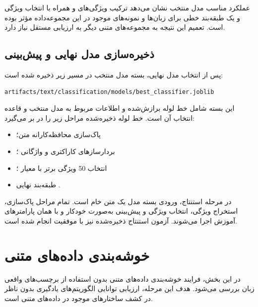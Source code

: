\documentclass[12pt,a4paper,oneside]{report}
\begin{document}
عملکرد مناسب مدل منتخب نشان می‌دهد ترکیب ویژگی‌های
و
همراه با انتخاب ویژگی
و یک طبقه‌بند خطی برای زبان‌ها و نمونه‌های موجود در این مجموعه‌داده مؤثر بوده است. تعمیم این نتیجه به مجموعه‌های متنی دیگر به ارزیابی مستقل نیاز دارد.


\subsection{ذخیره‌سازی مدل نهایی و پیش‌بینی}

پس از انتخاب مدل نهایی، بسته مدل منتخب در مسیر زیر ذخیره شده است:

\begin{latin}
\begin{verbatim}
artifacts/text/classification/models/best_classifier.joblib
\end{verbatim}
\end{latin}

این بسته شامل خط لوله برازش‌شده و اطلاعات مربوط به مدل منتخب و قاعده انتخاب آن است. خط لوله ذخیره‌شده مراحل زیر را در بر می‌گیرد:

\begin{itemize}
	\item پاک‌سازی محافظه‌کارانه متن؛
	\item بردارسازهای کاراکتری و واژگانی ؛
	\item انتخاب 50 ویژگی برتر با معیار ؛
	\item طبقه‌بند نهایی .
\end{itemize}

در مرحله استنتاج، ورودی بسته مدل یک متن خام
است. تمام مراحل پاک‌سازی، استخراج ویژگی، انتخاب ویژگی و پیش‌بینی به‌صورت خودکار و با همان پارامترهای آموزش اجرا می‌شوند. آزمون استنتاج ذخیره‌شده نیز با موفقیت انجام شده است.

\section{خوشه‌بندی داده‌های متنی}

در این بخش، فرایند خوشه‌بندی داده‌های متنی بدون استفاده از برچسب‌های واقعی زبان بررسی می‌شود. هدف این مرحله، ارزیابی توانایی الگوریتم‌های یادگیری بدون ناظر در کشف ساختارهای موجود در داده‌های متنی است.
\end{document}
